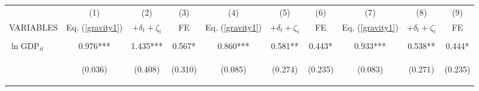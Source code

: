 \begin{center}
\begin{tabular}{lccccccccc} \hline
 & (1) & (2) & (3) & (4) & (5) & (6) & (7) & (8) & (9) \\
VARIABLES & Eq. (\ref{gravity1}) & $+\delta_t+\zeta_i$ & FE & Eq. (\ref{gravity1}) & $+\delta_t+\zeta_i$ & FE & Eq. (\ref{gravity1}) & $+\delta_t+\zeta_i$ & FE \\ \hline
\vspace{4pt} & \begin{footnotesize}\end{footnotesize} & \begin{footnotesize}\end{footnotesize} & \begin{footnotesize}\end{footnotesize} & \begin{footnotesize}\end{footnotesize} & \begin{footnotesize}\end{footnotesize} & \begin{footnotesize}\end{footnotesize} & \begin{footnotesize}\end{footnotesize} & \begin{footnotesize}\end{footnotesize} & \begin{footnotesize}\end{footnotesize} \\
$\ln\text{GDP}_{it}$ & 0.976*** & 1.435*** & 0.567* & 0.860*** & 0.581** & 0.443* & 0.933*** & 0.538** & 0.444* \\
\vspace{4pt} & \begin{footnotesize}(0.036)\end{footnotesize} & \begin{footnotesize}(0.408)\end{footnotesize} & \begin{footnotesize}(0.310)\end{footnotesize} & \begin{footnotesize}(0.085)\end{footnotesize} & \begin{footnotesize}(0.274)\end{footnotesize} & \begin{footnotesize}(0.235)\end{footnotesize} & \begin{footnotesize}(0.083)\end{footnotesize} & \begin{footnotesize}(0.271)\end{footnotesize} & \begin{footnotesize}(0.235)\end{footnotesize} \\

\end{tabular}
\end{center}
